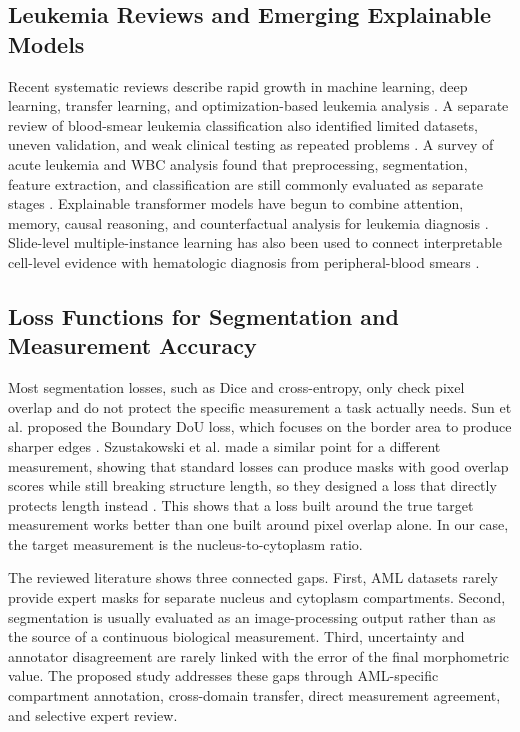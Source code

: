\documentclass[pdflatex,sn-mathphys-num]{sn-jnl}%
\theoremstyle{thmstyleone}%
\theoremstyle{thmstyletwo}%
\theoremstyle{thmstylethree}%
\begin{document}
\subsection{Leukemia Reviews and Emerging Explainable Models}

Recent systematic reviews describe rapid growth in machine learning, deep learning, transfer learning, and optimization-based leukemia analysis \cite{48}. A separate review of blood-smear leukemia classification also identified limited datasets, uneven validation, and weak clinical testing as repeated problems \cite{49}. A survey of acute leukemia and WBC analysis found that preprocessing, segmentation, feature extraction, and classification are still commonly evaluated as separate stages \cite{50}. Explainable transformer models have begun to combine attention, memory, causal reasoning, and counterfactual analysis for leukemia diagnosis \cite{51}. Slide-level multiple-instance learning has also been used to connect interpretable cell-level evidence with hematologic diagnosis from peripheral-blood smears \cite{52}.

\subsection{Loss Functions for Segmentation and Measurement Accuracy}

Most segmentation losses, such as Dice and cross-entropy, only check pixel overlap and do not protect the specific measurement a task actually needs. Sun et al. proposed the Boundary DoU loss, which focuses on the border area to produce sharper edges \cite{55}. Szustakowski et al. made a similar point for a different measurement, showing that standard losses can produce masks with good overlap scores while still breaking structure length, so they designed a loss that directly protects length instead \cite{56}. This shows that a loss built around the true target measurement works better than one built around pixel overlap alone. In our case, the target measurement is the nucleus-to-cytoplasm ratio.

The reviewed literature shows three connected gaps. First, AML datasets rarely provide expert masks for separate nucleus and cytoplasm compartments. Second, segmentation is usually evaluated as an image-processing output rather than as the source of a continuous biological measurement. Third, uncertainty and annotator disagreement are rarely linked with the error of the final morphometric value. The proposed study addresses these gaps through AML-specific compartment annotation, cross-domain transfer, direct measurement agreement, and selective expert review.
\end{document}
